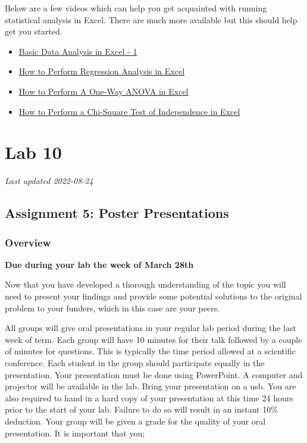 \documentclass[
]{book}
\providecommand{\tightlist}{%
  \setlength{\itemsep}{0pt}\setlength{\parskip}{0pt}}
\begin{document}
Below are a few videos which can help you get acquainted with running statistical analysis in Excel. There are much more available but this should help get you started.

\begin{itemize}
\tightlist
\item
  \href{https://www.youtube.com/watch?v=2xxMJEj4Oyg}{Basic Data Analysis in Excel - 1}
\item
  \href{https://www.youtube.com/watch?v=0wr9ojMxkuQ}{How to Perform Regression Analysis in Excel}
\item
  \href{https://www.youtube.com/watch?v=ZvfO7-J5u34}{How to Perform A One-Way ANOVA in Excel}
\item
  \href{https://www.youtube.com/watch?v=NDhmMH25AC4}{How to Perform a Chi-Square Test of Independence in Excel}
\end{itemize}

\hypertarget{part-lab-10}{%
\part*{Lab 10}\label{part-lab-10}}

\emph{Last updated 2022-08-24}

\hypertarget{assignment-5-poster-presentations}{%
\chapter*{Assignment 5: Poster Presentations}\label{assignment-5-poster-presentations}}

\hypertarget{overview-3}{%
\section*{Overview}\label{overview-3}}

\textbf{Due during your lab the week of March 28th}

Now that you have developed a thorough understanding of the topic you will need to present your findings and provide some potential solutions to the original problem to your funders, which in this case are your peers.

All groups will give oral presentations in your regular lab period during the last week of term. Each group will have 10 minutes for their talk followed by a couple of minutes for questions. This is typically the time period allowed at a scientific conference. Each student in the group should participate equally in the presentation. Your presentation must be done using PowerPoint. A computer and projector will be available in the lab. Bring your presentation on a usb. You are also required to hand in a hard copy of your presentation at this time 24 hours prior to the start of your lab. Failure to do so will result in an instant 10\% deduction. Your group will be given a grade for the quality of your oral presentation. It is important that you;
\end{document}
